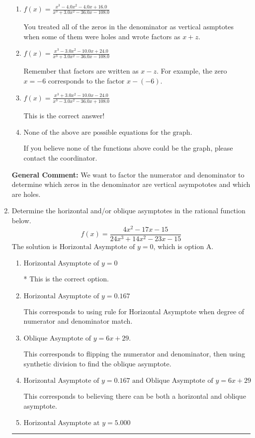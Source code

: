\documentclass{extbook}[14pt]
\newcommand{\litem}[1]{\item #1

\rule{\textwidth}{0.4pt}}
\begin{document}
\begin{enumerate}
{\begin{enumerate}[label=\Alph*.]
You treated all of the zeros in the denominator as vertical asymptotes when some of them were holes!
\item \( f(x)=\frac{x^{3} -4.0 x^{2} -4.0 x + 16.0}{x^{3} +3.0 x^{2} -36.0 x -108.0} \)

You treated all of the zeros in the denominator as vertical asmptotes when some of them were holes and wrote factors as $x+z$.
\item \( f(x)=\frac{x^{3} -3.0 x^{2} -10.0 x + 24.0}{x^{3} +3.0 x^{2} -36.0 x -108.0} \)

Remember that factors are written as $x-z$. For example, the zero $x=-6$ corresponds to the factor $x-(-6)$.
\item \( f(x)=\frac{x^{3} +3.0 x^{2} -10.0 x -24.0}{x^{3} -3.0 x^{2} -36.0 x + 108.0} \)

This is the correct answer!
\item \( \text{None of the above are possible equations for the graph.} \)

If you believe none of the functions above could be the graph, please contact the coordinator.
\end{enumerate}

\textbf{General Comment:} We want to factor the numerator and denominator to determine which zeros in the denominator are vertical asympototes and which are holes.
}
\litem{
Determine the horizontal and/or oblique asymptotes in the rational function below.
\[ f(x) = \frac{4x^{2} -17 x -15}{24x^{3} +14 x^{2} -23 x -15} \]The solution is \( \text{Horizontal Asymptote of } y = 0 \), which is option A.\begin{enumerate}[label=\Alph*.]
\item \( \text{Horizontal Asymptote of } y = 0 \)

* This is the correct option.
\item \( \text{Horizontal Asymptote of } y = 0.167  \)

This corresponds to using rule for Horizontal Asymptote when degree of numerator and denominator match.
\item \( \text{Oblique Asymptote of } y = 6x + 29. \)

This corresponds to flipping the numerator and denominator, then using synthetic division to find the oblique asymptote.
\item \( \text{Horizontal Asymptote of } y = 0.167 \text{ and Oblique Asymptote of } y = 6x + 29 \)

This corresponds to believing there can be both a horizontal and oblique asymptote.
\item \( \text{Horizontal Asymptote at } y = 5.000 \)


\end{enumerate}}
\end{enumerate}
\end{document}
